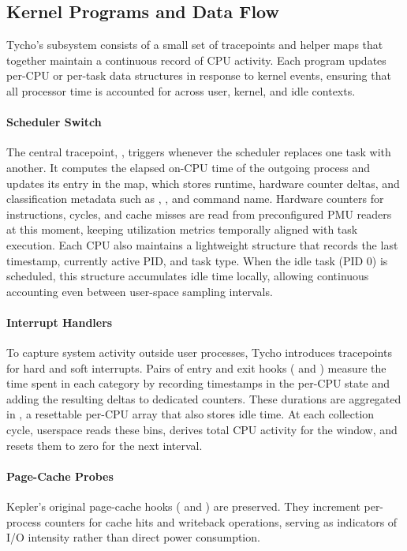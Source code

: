 \subsection{Kernel Programs and Data Flow}
\label{subsec:ebpf-collector-programs}

Tycho’s  subsystem consists of a small set of tracepoints and helper maps that together maintain a continuous record of CPU activity.  
Each program updates per-CPU or per-task data structures in response to kernel events, ensuring that all processor time is accounted for across user, kernel, and idle contexts.

\paragraph{Scheduler Switch}
The central tracepoint, , triggers whenever the scheduler replaces one task with another.  
It computes the elapsed on-CPU time of the outgoing process and updates its entry in the  map, which stores runtime, hardware counter deltas, and classification metadata such as , , and command name.  
Hardware counters for instructions, cycles, and cache misses are read from preconfigured PMU readers at this moment, keeping utilization metrics temporally aligned with task execution.  
Each CPU also maintains a lightweight  structure that records the last timestamp, currently active PID, and task type.  
When the idle task (PID 0) is scheduled, this structure accumulates idle time locally, allowing continuous accounting even between user-space sampling intervals.

\paragraph{Interrupt Handlers}
To capture system activity outside user processes, Tycho introduces tracepoints for hard and soft interrupts.  
Pairs of entry and exit hooks ( and ) measure the time spent in each category by recording timestamps in the per-CPU state and adding the resulting deltas to dedicated counters.  
These durations are aggregated in , a resettable per-CPU array that also stores idle time.  
At each collection cycle, userspace reads these bins, derives total CPU activity for the window, and resets them to zero for the next interval.

\paragraph{Page-Cache Probes}
Kepler’s original page-cache hooks ( and ) are preserved.  
They increment per-process counters for cache hits and writeback operations, serving as indicators of I/O intensity rather than direct power consumption.


